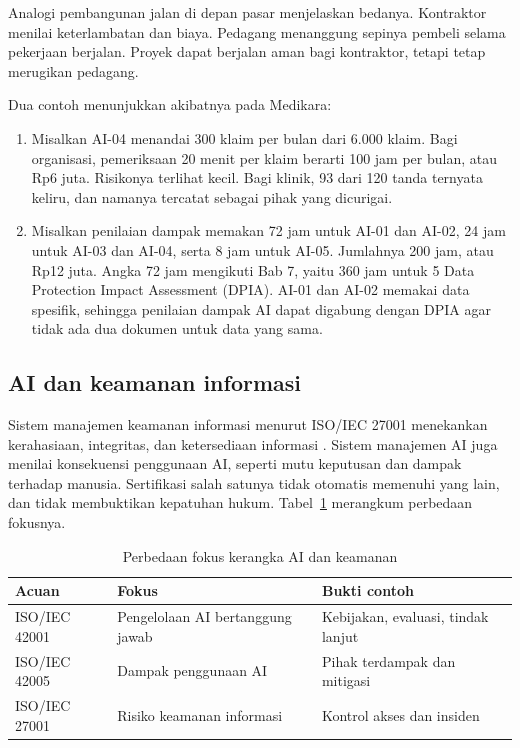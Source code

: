 Analogi pembangunan jalan di depan pasar menjelaskan bedanya. Kontraktor menilai keterlambatan dan
biaya. Pedagang menanggung sepinya pembeli selama pekerjaan berjalan. Proyek dapat berjalan aman
bagi kontraktor, tetapi tetap merugikan pedagang.

Dua contoh menunjukkan akibatnya pada Medikara:
\begin{enumerate}
  \item Misalkan AI-04 menandai 300 klaim per bulan dari 6.000 klaim. Bagi organisasi, pemeriksaan
  20 menit per klaim berarti 100 jam per bulan, atau Rp6 juta. Risikonya terlihat kecil. Bagi
  klinik, 93 dari 120 tanda ternyata keliru, dan namanya tercatat sebagai pihak yang dicurigai.
  \item Misalkan penilaian dampak memakan 72 jam untuk AI-01 dan AI-02, 24 jam untuk AI-03 dan
  AI-04, serta 8 jam untuk AI-05. Jumlahnya 200 jam, atau Rp12 juta. Angka 72 jam mengikuti Bab 7,
  yaitu 360 jam untuk 5 Data Protection Impact Assessment (DPIA). AI-01 dan AI-02 memakai data
  spesifik, sehingga penilaian dampak AI dapat digabung dengan DPIA agar tidak ada dua dokumen untuk
  data yang sama.
\end{enumerate}

\subsection*{AI dan keamanan informasi}

Sistem manajemen keamanan informasi menurut ISO/IEC 27001 menekankan kerahasiaan, integritas, dan
ketersediaan informasi \cite{iso27001-2022}. Sistem manajemen AI juga menilai konsekuensi penggunaan
AI, seperti mutu keputusan dan dampak terhadap manusia. Sertifikasi salah satunya tidak otomatis
memenuhi yang lain, dan tidak membuktikan kepatuhan hukum. Tabel~\ref{tab:ch11-sistem-manajemen-ai}
merangkum perbedaan fokusnya.

\begin{table}[!htb]
  \centering\small
  \caption{Perbedaan fokus kerangka AI dan keamanan}\label{tab:ch11-sistem-manajemen-ai}
  \begin{tabularx}{\textwidth}{|>{\raggedright\arraybackslash}X|>{\raggedright\arraybackslash}X|>{\raggedright\arraybackslash}X|}
    \hline
    \textbf{Acuan} & \textbf{Fokus} & \textbf{Bukti contoh} \\ \hline
    ISO/IEC 42001 & Pengelolaan AI bertanggung jawab & Kebijakan, evaluasi, tindak lanjut \\ \hline
    ISO/IEC 42005 & Dampak penggunaan AI & Pihak terdampak dan mitigasi \\ \hline
    ISO/IEC 27001 & Risiko keamanan informasi & Kontrol akses dan insiden \\ \hline
  \end{tabularx}
\end{table}

